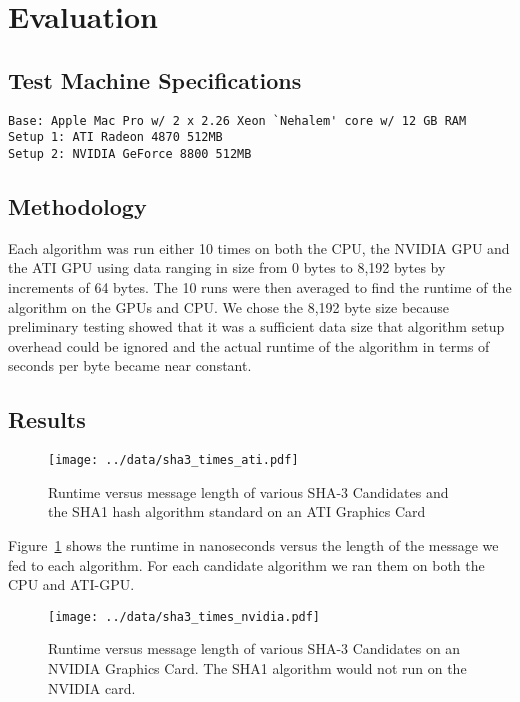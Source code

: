 \section*{Evaluation}

\subsection*{Test Machine Specifications}
\begin{verbatim}
Base: Apple Mac Pro w/ 2 x 2.26 Xeon `Nehalem' core w/ 12 GB RAM
Setup 1: ATI Radeon 4870 512MB
Setup 2: NVIDIA GeForce 8800 512MB
\end{verbatim}

\subsection*{Methodology}
Each algorithm was run either 10 times on both the CPU, the NVIDIA GPU and the ATI GPU using data ranging in size from 0 bytes to 8,192 bytes by increments of 64 bytes.
The 10 runs were then averaged to find the runtime of the algorithm on the GPUs and CPU.
We chose the 8,192 byte size because preliminary testing showed that it was a sufficient data size that algorithm setup overhead could be ignored and the actual runtime of the algorithm in terms of seconds per byte became near constant.

\subsection*{Results}

\begin{figure}[htp]
\texttt{[image: ../data/sha3\_times\_ati.pdf]}
\caption{Runtime versus message length of various SHA-3 Candidates and the SHA1 hash algorithm standard  on an ATI Graphics Card}\label{fig:sha3_times_ati}
\end{figure}

Figure~\ref{fig:sha3_times_ati} shows the runtime in nanoseconds versus the length of the message we fed to each algorithm. For each candidate algorithm we ran them on both the CPU and ATI-GPU.

\begin{figure}[htp]
\texttt{[image: ../data/sha3\_times\_nvidia.pdf]}
\caption{Runtime versus message length of various SHA-3 Candidates on an NVIDIA Graphics Card. The SHA1 algorithm would not run on the NVIDIA card.}\label{fig:sha3_times_nvidia}
\end{figure}

